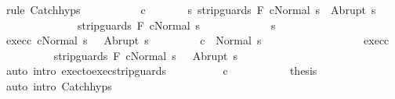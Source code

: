 \begin{isabellebody}
\ {\isacharparenleft}rule\ Catch{\isachardot}hyps{\isacharparenright}\isanewline
\ \ \ \ \isamarkupfalse%
\isanewline
\ \ \ \ \isamarkupfalse%
\ c{}{\isacharcolon}\ \isanewline
\ \ \ \ \ \ {\isachardoublequoteopen}{\isasymforall}s{\isacharprime}{\isacharprime}{\isachardot}\ {\isasymGamma}{\isasymturnstile}{\isasymlangle}strip{\isacharunderscore}guards\ F\ c{}{\isacharcomma}Normal\ s{\isacharprime}{\isasymrangle}\ {\isasymRightarrow}\ Abrupt\ s{\isacharprime}{\isacharprime}\ \ \ \isanewline
\ \ \ \ \ \ \ \ \ \ \ \ \ {\isasymlongrightarrow}\ {\isasymGamma}{\isasymturnstile}strip{\isacharunderscore}guards\ F\ c{}{\isasymdown}Normal\ s{\isacharprime}{\isacharprime}{\isachardoublequoteclose}\isanewline
\ \ \ \ \isacommand{{\isacharbraceleft}}\isamarkupfalse%
\isanewline
\ \ \ \ \ \ \isamarkupfalse%
\ s{\isacharprime}{\isacharprime}\ \isamarkupfalse%
\ exec{\isacharunderscore}c{}{\isacharcolon}\ {\isachardoublequoteopen}{\isasymGamma}{\isasymturnstile}{\isasymlangle}c{}{\isacharcomma}Normal\ s{\isacharprime}\ {\isasymrangle}\ {\isasymRightarrow}\ Abrupt\ s{\isacharprime}{\isacharprime}{\isachardoublequoteclose}\isanewline
\ \ \ \ \ \ \isamarkupfalse%
\ {\isachardoublequoteopen}\ {\isasymGamma}{\isasymturnstile}c{}\ {\isasymdown}\ Normal\ s{\isacharprime}{\isacharprime}{\isachardoublequoteclose}\isanewline
\ \ \ \ \ \ \isamarkupfalse%
\ {\isacharminus}\isanewline
\ \ \ \ \ \ \ \ \isamarkupfalse%
\ exec{\isacharunderscore}c{}\isanewline
\ \ \ \ \ \ \ \ \isamarkupfalse%
\ {\isachardoublequoteopen}{\isasymGamma}{\isasymturnstile}{\isasymlangle}strip{\isacharunderscore}guards\ F\ c{}{\isacharcomma}Normal\ s{\isacharprime}\ {\isasymrangle}\ {\isasymRightarrow}\ Abrupt\ s{\isacharprime}{\isacharprime}{\isachardoublequoteclose}\isanewline
\ \ \ \ \ \ \ \ \ \ \isamarkupfalse%
\ {\isacharparenleft}auto\ intro{\isacharcolon}\ exec{\isacharunderscore}to{\isacharunderscore}exec{\isacharunderscore}strip{\isacharunderscore}guards{\isacharparenright}\isanewline
\ \ \ \ \ \ \ \ \isamarkupfalse%
\ c{}\ \isanewline
\ \ \ \ \ \ \ \ \isamarkupfalse%
\ {\isacharquery}thesis\isanewline
\ \ \ \ \ \ \ \ \ \ \isamarkupfalse%
\ {\isacharparenleft}auto\ intro{\isacharcolon}\ Catch{\isachardot}hyps{\isacharparenright}\isanewline
\ \ \ \ \ \ \isamarkupfalse%
\isanewline

\end{isabellebody}
